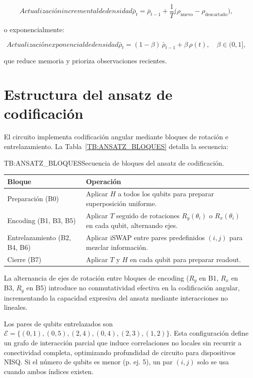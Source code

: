 \begin{equation}[eq:densidad_media_incremental]{Actualización incremental de densidad}
\bar{\rho}_t = \bar{\rho}_{t-1} + \frac{1}{T}\big(\rho_{\text{nuevo}} - \rho_{\text{descartado}}\big),
\end{equation}

o exponencialmente:

\begin{equation}[eq:densidad_media_exponencial]{Actualización exponencial de densidad}
\bar{\rho}_t = (1-\beta)\,\bar{\rho}_{t-1} + \beta\,\rho(t), \quad \beta\in(0,1],
\end{equation}

que reduce memoria y prioriza observaciones recientes.

\section{Estructura del ansatz de codificación}
\label{ap:estructura_ansatz}

El circuito implementa codificación angular mediante bloques de rotación e entrelazamiento. La Tabla~\ref{TB:ANSATZ_BLOQUES} detalla la secuencia:

\begin{table}[Bloques del ansatz]{TB:ANSATZ_BLOQUES}{Secuencia de bloques del ansatz de codificación.}
\begin{tabular}{p{2.5cm}p{10.0cm}}
    \textbf{Bloque} & \textbf{Operación} \\
    \hline
    Preparación (B0) & Aplicar $H$ a todos los qubits para preparar superposición uniforme. \\
    Encoding (B1, B3, B5) & Aplicar $T$ seguido de rotaciones $R_y(\theta_i)$ o $R_x(\theta_i)$ en cada qubit, alternando ejes. \\
    Entrelazamiento (B2, B4, B6) & Aplicar iSWAP entre pares predefinidos $(i,j)$ para mezclar información. \\
    Cierre (B7) & Aplicar $T$ y $H$ en cada qubit para preparar readout. \\
\end{tabular}
\end{table}

La alternancia de ejes de rotación entre bloques de encoding ($R_y$ en B1, $R_x$ en B3, $R_y$ en B5) introduce no conmutatividad efectiva en la codificación angular, incrementando la capacidad expresiva del ansatz mediante interacciones no lineales.

Los pares de qubits entrelazados son $\mathcal{E} = \{(0,1), (0,5), (2,4), (0,4), (2,3), (1,2)\}$. Esta configuración define un grafo de interacción parcial que induce correlaciones no locales sin recurrir a conectividad completa, optimizando profundidad de circuito para dispositivos NISQ. Si el número de qubits es menor (p. ej. 5), un par $(i,j)$ solo se usa cuando ambos índices existen.

